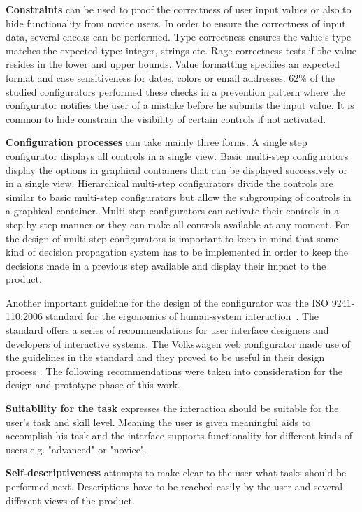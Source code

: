 \documentclass[../medieninformatik-arbeit.tex]{subfiles}
\begin{document}
\textbf{Constraints} can be used to proof the correctness of user input values or also to hide functionality from novice users. In order to ensure the correctness of input data, several checks can be performed. Type correctness ensures the value's type matches the expected type: integer, strings etc. Rage correctness tests if the value resides in the lower and upper bounds. Value formatting specifies an expected format and case sensitiveness for dates, colors or email addresses. 62\% of the studied configurators performed these checks in a prevention pattern where the configurator notifies the user of a mistake before he submits the input value. It is common to hide constrain the visibility of certain controls if not activated. 

\textbf{Configuration processes} can take mainly three forms. A single step configurator displays all controls in a single view. Basic multi-step configurators display the options in graphical containers that can be displayed successively or in a single view. Hierarchical multi-step configurators divide the controls are similar to basic multi-step configurators but allow the subgrouping of controls in a graphical container. Multi-step configurators can activate their controls in a step-by-step manner or they can make all controls available at any moment. For the design of multi-step configurators is important to keep in mind that some kind of decision propagation system has to be implemented in order to keep the decisions made in a previous step available and display their impact to the product.

Another important guideline for the design of the configurator was the ISO 9241-110:2006 standard for the ergonomics of human-system interaction\ \cite{fdis20069241}. The standard offers a series of recommendations for user interface designers and developers of interactive systems. The Volkswagen web configurator made use of the guidelines in the standard and they proved to be useful in their design process \cite{Konstanzer20078609220}. The following recommendations were taken into consideration for the design and prototype phase of this work. 

\textbf{Suitability for the task} expresses the interaction should be suitable for the user's task and skill level. Meaning the user is given meaningful aids to accomplish his task and the interface supports functionality for different kinds of users e.g. "advanced" or "novice".

\textbf{Self-descriptiveness} attempts to make clear to the user what tasks should be performed next. Descriptions have to be reached easily by the user and several different views of the product.
\end{document}
